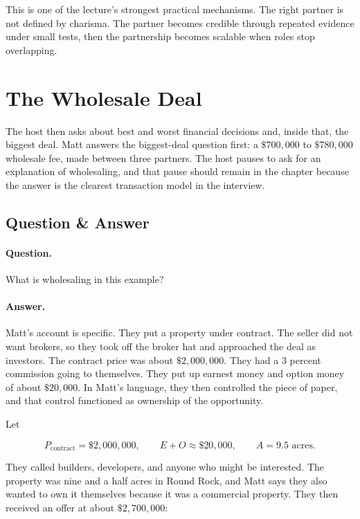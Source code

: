 This is one of the lecture's strongest practical mechanisms. The right partner is not defined by charisma. The partner becomes credible through repeated evidence under small tests, then the partnership becomes scalable when roles stop overlapping.

\section{The Wholesale Deal}

The host then asks about best and worst financial decisions and, inside that, the biggest deal. Matt answers the biggest-deal question first: a \(\$700{,}000\) to \(\$780{,}000\) wholesale fee, made between three partners. The host pauses to ask for an explanation of wholesaling, and that pause should remain in the chapter because the answer is the clearest transaction model in the interview.

\subsection{Question \& Answer}

\paragraph{Question.}
What is wholesaling in this example?

\paragraph{Answer.}
Matt's account is specific. They put a property under contract. The seller did not want brokers, so they took off the broker hat and approached the deal as investors. The contract price was about \(\$2{,}000{,}000\). They had a 3 percent commission going to themselves. They put up earnest money and option money of about \(\$20{,}000\). In Matt's language, they then controlled the piece of paper, and that control functioned as ownership of the opportunity.

Let

\begin{equation}
P_{\text{contract}}=\$2{,}000{,}000,
\qquad
E+O\approx \$20{,}000,
\qquad
A=9.5\text{ acres}.
\end{equation}

They called builders, developers, and anyone who might be interested. The property was nine and a half acres in Round Rock, and Matt says they also wanted to own it themselves because it was a commercial property. They then received an offer at about \(\$2{,}700{,}000\):

